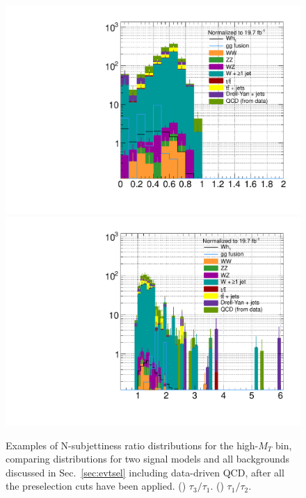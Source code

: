 \begin{figure}[hbtp]
  \begin{center}
    \includegraphics[width=1.2\cmsFigWidth]{figures/sigVsBkg_t3t1_highMT}
    \includegraphics[width=1.2\cmsFigWidth]{figures/sigVsBkg_t1t2_highMT}
    \caption{Examples of N-subjettiness ratio distributions for the high-$M_{T}$ bin, comparing distributions for two signal models and all backgrounds discussed in Sec.~\ref{sec:evtsel} including data-driven QCD, after all the preselection cuts have been applied. (\cmsLeft) $\tau_{3}/\tau_{1}$. (\cmsRight) $\tau_{1}/\tau_{2}$.}
    \label{fig:nsubjettiness-ratios-highMT}
  \end{center}
\end{figure}
